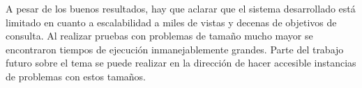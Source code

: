\documentclass{article}
\begin{document}
A pesar de los buenos resultados, hay que aclarar que el sistema desarrollado
está limitado en cuanto a escalabilidad a miles de vistas y decenas de objetivos
de consulta. Al realizar pruebas con problemas de tamaño mucho mayor se
encontraron tiempos de ejecución inmanejablemente grandes. Parte del trabajo
futuro sobre el tema se puede realizar en la dirección de hacer accesible
instancias de problemas con estos tamaños.
\end{document}
